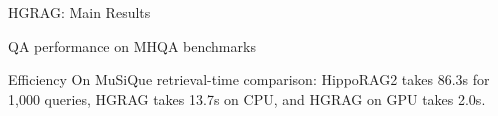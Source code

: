 \begin{frame}{HGRAG: Main Results}
\scriptsize
\begin{block}{QA performance on MHQA benchmarks}
\centering
{}
\end{block}
\begin{block}{Efficiency}
On MuSiQue retrieval-time comparison: HippoRAG2 takes 86.3s for 1,000 queries, HGRAG takes 13.7s on CPU, and HGRAG on GPU takes 2.0s.
\end{block}
\end{frame}
